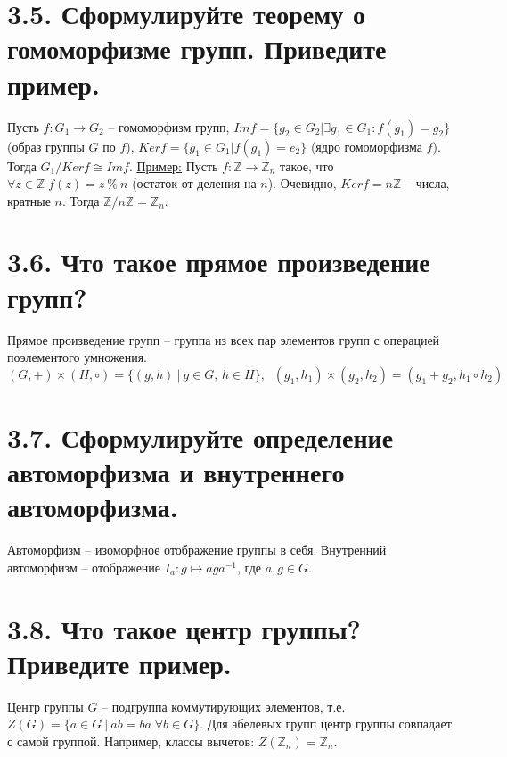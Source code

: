 \documentclass{article}
\begin{document}
\section*{\LARGE 3.5. Сформулируйте теорему о гомоморфизме групп. Приведите пример.}
Пусть $f : G_1 \rightarrow G_2$ -- гомоморфизм групп,
\newline $Imf = \{g_2 \in G_2 | \exists g_1 \in G_1 : f(g_1) = g_2\}$ (образ группы $G$ по $f$), 
\newline $Kerf = \{g_1 \in G_1 | f(g_1) = e_2\}$ (ядро гомоморфизма $f$).
\newline Тогда $G_1/Kerf \cong Imf$.
\newline \underline{Пример:}
\newline Пусть $f : \mathbb{Z} \rightarrow \mathbb{Z}_n$ такое, что $\forall z \in \mathbb{Z} \; f(z) = z \:\%\: n$ (остаток от деления на $n$). Очевидно, $Kerf = n\mathbb{Z}$ -- числа, кратные $n$. Тогда $\mathbb{Z}/n\mathbb{Z} = \mathbb{Z}_n$.

\section*{\LARGE 3.6. Что такое прямое произведение групп?}
Прямое произведение групп -- группа из всех пар элементов групп с операцией поэлементого умножения.
$$(G, +) \times (H, \circ) = \{(g, h) \:|\: g \in G,\, h \in H\},\;\; (g_1, h_1)\times(g_2, h_2) = (g_1 + g_2, h_1 \circ h_2)$$

\section*{\LARGE 3.7. Сформулируйте определение автоморфизма и внутреннего автоморфизма. }
Автоморфизм -- изоморфное отображение группы в себя. Внутренний автоморфизм -- отображение $I_a : g \mapsto aga^{-1}$, где $a,g \in G$.

\section*{\LARGE 3.8. Что такое центр группы? Приведите пример. }
Центр группы $G$ -- подгруппа коммутирующих элементов, т.е. 
\newline $Z(G) = \{a \in G \:|\: ab = ba \; \forall b \in G\}$.
\newline Для абелевых групп центр группы совпадает с самой группой. Например, 
\newline классы вычетов: $Z(\mathbb{Z}_n) = \mathbb{Z}_n$.
\end{document}

